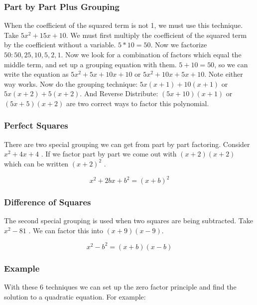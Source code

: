 \documentclass{book}
\theoremstyle{definition}
\begin{document}
\subsubsection{Part by Part Plus Grouping}

When the coefficient of the squared term is not 1, we must use this technique. Take $5x^2+15x+10$. We must first multiply the coefficient of the squared term by the coefficient without a variable. $5*10=50$. Now we factorize $50: 50,25,10,5,2,1 $. Now we look for a combination of factors which equal the middle term, and set up a grouping equation with them. $5+10=50$, so we can write the equation as $5x^2+5x+10x+10$ or $5x^2+10x+5x+10$. Note either way works. Now do the grouping technique: $5x(x+1)+10(x+1)$ or $5x(x+2)+5(x+2)$. And Reverse Distribute: $(5x+10)(x+1)$ or $(5x+5)(x+2)$ are two correct ways to factor this polynomial.

\subsubsection{Perfect Squares}

There are two special grouping we can get from part by part factoring. Consider $x^2+4x+4$ . If we factor part by part we come out with $(x+2)(x+2)$ which can be written $(x+2)^2$ .

\begin{equation}
\label{(6.7)}
x^2+2bx+b^2 = (x+b)^2
\end{equation}

\subsubsection{Difference of Squares}

The second special grouping is used when two squares are being subtracted. Take $x^2-81$ . We can factor this into $(x+9)(x-9)$.

\begin{equation}
\label{(6.8)}
x^2-b^2=(x+b)(x-b)
\end{equation}

\subsubsection{Example}	
With these 6 techniques we can set up the zero factor principle and find the solution to a quadratic equation. For example:
\end{document}
